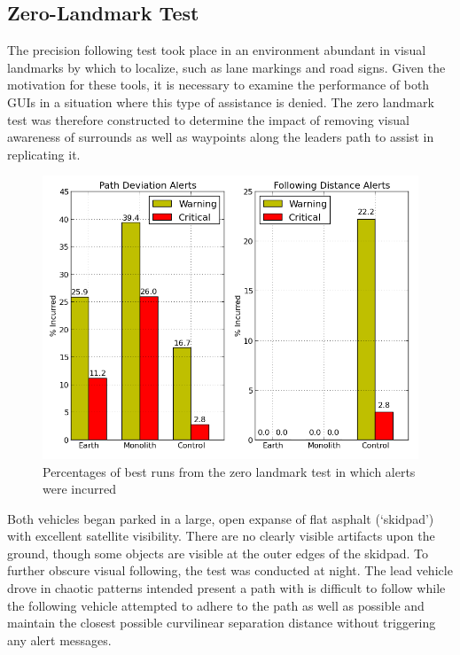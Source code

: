 \documentclass[twocolumn,10pt]{article}
\begin{document}



  \subsection*{Zero-Landmark Test}

    The precision following test took place in an environment abundant in visual landmarks by which to localize, such as lane markings and road signs.  Given the motivation for these tools, it is necessary to examine the performance of both GUIs in a situation where this type of assistance is denied.  The zero landmark test was therefore constructed to determine the impact of removing visual awareness of surrounds as well as waypoints along the leaders path to assist in replicating it.
    
    \begin{figure}[ht] \centering
      \includegraphics[width=\columnwidth]{../graphics/zero_landmark_alert_percents.png}
      \caption{Percentages of best runs from the zero landmark test in which alerts were incurred}
      \label{fig:zero_landmark_alert_percents}
    \end{figure}

    Both vehicles began parked in a large, open expanse of flat asphalt (`skidpad') with excellent satellite visibility.  There are no clearly visible artifacts upon the ground, though some objects are visible at the outer edges of the skidpad.  To further obscure visual following, the test was conducted at night.  The lead vehicle drove in chaotic patterns intended present a path with is difficult to follow while the following vehicle attempted to adhere to the path as well as possible and maintain the closest possible curvilinear separation distance without triggering any alert messages.
\end{document}
